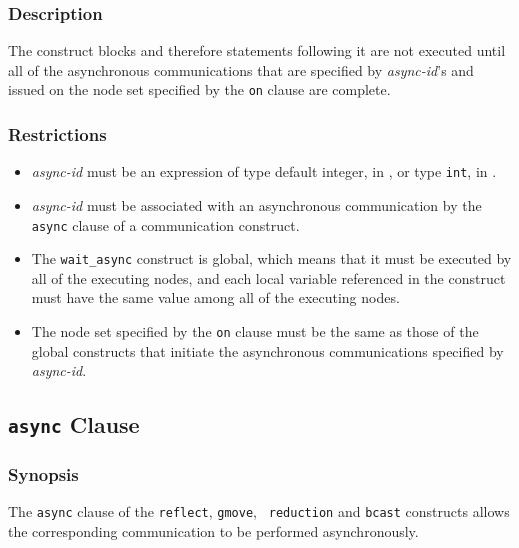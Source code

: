 \subsubsection*{Description}

The {\tt {}} construct blocks and therefore
statements following it are not executed until all of the asynchronous
communications that are specified by {\it async-id}'s and issued on the
node set specified by the {\tt on} clause are complete. 

\subsubsection*{Restrictions}

\begin{itemize}
 \item {\it async-id} must be an expression of type default integer, in
       {\XMPF}, or type {\tt int}, in {\XMPC}.
 \item {\it async-id} must be associated with an asynchronous
       communication by the {\tt async} clause of a communication
       construct.
 \item The {\tt wait\_async} construct is global, which means that it must
       be executed by all of the executing nodes, and each local variable
       referenced in the construct must have the same value among all of
       the executing nodes.
 \item The node set specified by the {\tt on} clause must be the same as
       those of the global constructs that initiate the asynchronous
       communications specified by {\it async-id}.
\end{itemize}


\subsection{{\tt async} Clause}

\subsubsection*{Synopsis}

The {\tt async} clause of the {\tt reflect}, {\tt gmove}, {\tt
reduction} and {\tt bcast} constructs allows the corresponding
communication to be performed asynchronously.

